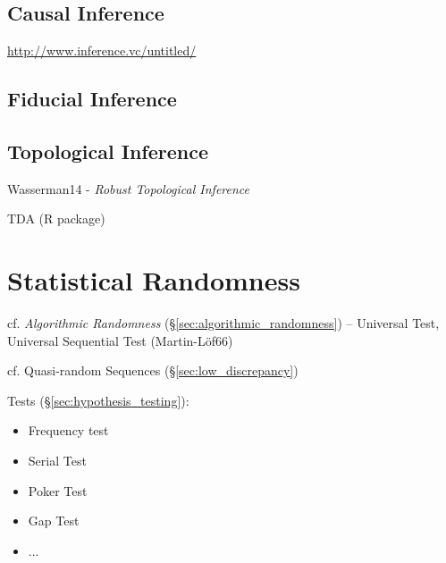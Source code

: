 \subsection{Causal Inference}\label{sec:causal_inference}

\url{http://www.inference.vc/untitled/}



\subsection{Fiducial Inference}\label{sec:fiducial_inference}

\subsection{Topological Inference}\label{sec:topological_inference}

Wasserman14 - \emph{Robust Topological Inference}

TDA (R package)



\section{Statistical Randomness}\label{sec:statistical_randomness}

cf. \emph{Algorithmic Randomness} (\S\ref{sec:algorithmic_randomness}) --
Universal Test, Universal Sequential Test (Martin-L\"of66)

cf. Quasi-random Sequences (\S\ref{sec:low_discrepancy})

Tests (\S\ref{sec:hypothesis_testing}):
\begin{itemize}
  \item Frequency test
  \item Serial Test
  \item Poker Test
  \item Gap Test
  \item ...
\end{itemize}



